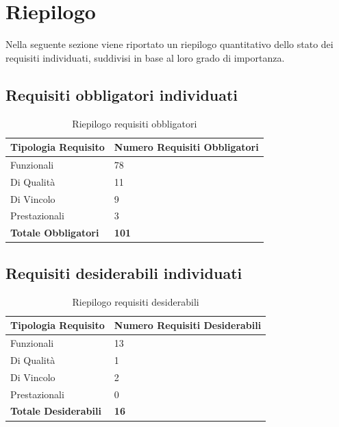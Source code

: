 \section{Riepilogo}
Nella seguente sezione viene riportato un riepilogo quantitativo dello stato dei requisiti individuati, suddivisi in base al loro grado di importanza.

\subsection{Requisiti obbligatori individuati}
\begin{table}[htbp]
	\centering
	\caption{Riepilogo requisiti obbligatori}
	\label{tab:riepilogo-obbligatori}
	\renewcommand{\arraystretch}{1.3}
	\small
	\begin{tabularx}{0.8\textwidth}{|p{4.5cm}|X|}
		\hline
		\rowcolor[gray]{0.88}
		\textbf{Tipologia Requisito} & \textbf{Numero Requisiti Obbligatori} \\
		\hline
		Funzionali & 78 \\ \hline
		Di Qualit\`a & 11 \\ \hline
		Di Vincolo & 9 \\ \hline
		Prestazionali & 3 \\ \hline
		\textbf{Totale Obbligatori} & \textbf{101} \\ \hline
	\end{tabularx}
\end{table}

\subsection{Requisiti desiderabili individuati}
\begin{table}[htbp]
	\centering
	\caption{Riepilogo requisiti desiderabili}
	\label{tab:riepilogo-desiderabili}
	\renewcommand{\arraystretch}{1.3}
	\small
	\begin{tabularx}{0.8\textwidth}{|p{4.5cm}|X|}
		\hline
		\rowcolor[gray]{0.88}
		\textbf{Tipologia Requisito} & \textbf{Numero Requisiti Desiderabili} \\
		\hline
		Funzionali & 13 \\ \hline
		Di Qualit\`a & 1 \\ \hline
		Di Vincolo & 2 \\ \hline
		Prestazionali & 0 \\ \hline
		\textbf{Totale Desiderabili} & \textbf{16} \\ \hline
	\end{tabularx}
\end{table}

